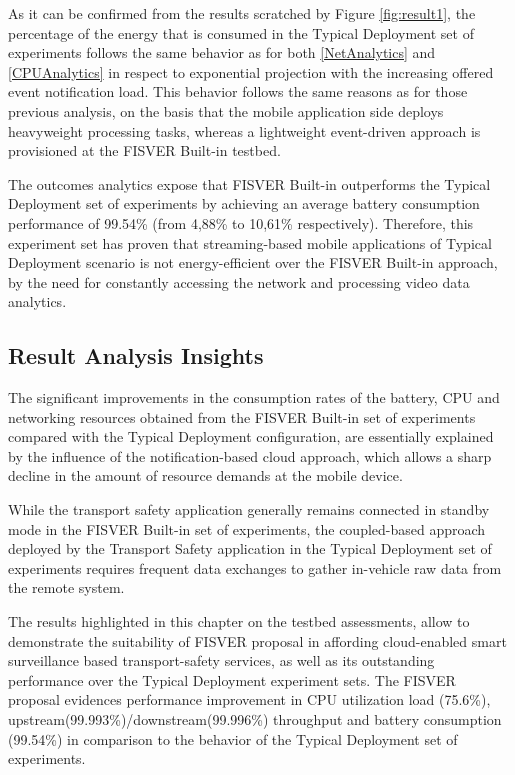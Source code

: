 As it can be confirmed from the results scratched by Figure \ref{fig:result1}, the percentage of the energy that is consumed in the Typical Deployment set of experiments follows the same behavior as for both \ref{NetAnalytics} and \ref{CPUAnalytics} in respect to exponential projection with the increasing offered event notification load. This behavior follows the same reasons as for those previous analysis, on the basis that the mobile application side deploys heavyweight processing tasks, whereas a lightweight event-driven approach is provisioned at the FISVER Built-in testbed.

The outcomes analytics expose that FISVER Built-in outperforms the Typical Deployment set of experiments by achieving an average battery consumption performance of 99.54\% (from 4,88\% to 10,61\% respectively). Therefore, this experiment set has proven that streaming-based mobile applications of Typical Deployment scenario is not energy-efficient over the FISVER Built-in approach, by the need for constantly accessing the network and processing video data analytics.

\subsection{Result Analysis Insights}
\label{ResAnalyIns}

The significant improvements in the consumption rates of the battery, CPU and networking resources obtained from the FISVER Built-in set of experiments compared with the Typical Deployment configuration, are essentially explained by the influence of the notification-based cloud approach, which allows a sharp decline in the amount of resource demands at the mobile device.

While the transport safety application generally remains connected in standby mode in the FISVER Built-in set of experiments, the coupled-based approach deployed by the Transport Safety application in the Typical Deployment set of experiments requires frequent data exchanges to gather in-vehicle raw data from the remote system.

The results highlighted in this chapter on the testbed assessments, allow to demonstrate the suitability of FISVER proposal in affording cloud-enabled smart surveillance based transport-safety services, as well as its outstanding performance over the Typical Deployment experiment sets. The FISVER proposal evidences performance improvement in CPU utilization load (75.6\%), upstream(99.993\%)/downstream(99.996\%) throughput and battery consumption (99.54\%) in comparison to the behavior of the Typical Deployment set of experiments.
